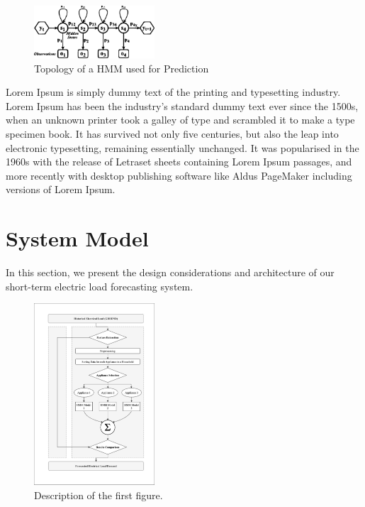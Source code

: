 \documentclass[conference]{IEEEtran}
\begin{document}
\begin{figure}[htbp]
  \centering
  \includegraphics[width=0.4\textwidth]{HMM.eps}
  \caption{Topology of a HMM used for Prediction}
  \label{fig:figure3}
\end{figure}


Lorem Ipsum is simply dummy text of the printing and typesetting industry. Lorem Ipsum has been the industry's standard dummy text ever since the 1500s, when an unknown printer took a galley of type and scrambled it to make a type specimen book. It has survived not only five centuries, but also the leap into electronic typesetting, remaining essentially unchanged. It was popularised in the 1960s with the release of Letraset sheets containing Lorem Ipsum passages, and more recently with desktop publishing software like Aldus PageMaker including versions of Lorem Ipsum.

\section{System Model}
In this section, we present the design considerations and architecture of our short-term electric load forecasting system.

\begin{figure}[htbp]
  \centering
  \includegraphics[width=0.4\textwidth]{HMM_Model.eps}
  \caption{Description of the first figure.}
  \label{fig:figure4}
\end{figure}
\end{document}
